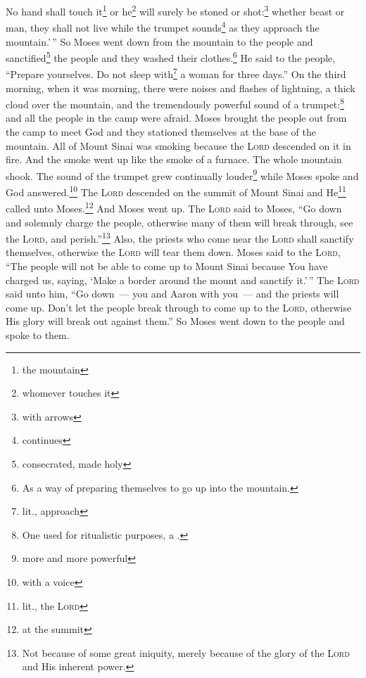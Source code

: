 \begin{enumerate}[align=center]
     No hand shall touch it\footnote{the mountain} or he\footnote{whomever touches it} will surely be stoned or shot:\footnote{with arrows} whether beast or man, they shall not live while the trumpet sounds\footnote{continues} as they approach the mountain.'\,''%
     So Moses went down from the mountain to the people and sanctified\footnote{consecrated, made holy} the people and they washed their clothes.\footnote{As a way of preparing themselves to go up into the mountain.}%
     He said to the people, ``Prepare yourselves. Do not sleep with\footnote{lit., approach} a woman for three days.''%
     On the third morning, when it was morning, there were noises and flashes of lightning, a thick cloud over the mountain, and the tremendously powerful sound of a trumpet:\footnote{One used for ritualistic purposes, a .} and all the people in the camp were afraid.%
     Moses brought the people out from the camp to meet God and they stationed themselves at the base of the mountain.%
     All of Mount Sinai was smoking because the \textsc{Lord} descended on it in fire. And the smoke went up like the smoke of a furnace. The whole mountain shook.%
     The sound of the trumpet grew continually louder\footnote{more and more powerful} while Moses spoke and God answered.\footnote{with a voice}%
     The \textsc{Lord} descended on the summit of Mount Sinai and He\footnote{lit., the \textsc{Lord}} called unto Moses.\footnote{at the summit} And Moses went up.%
     The \textsc{Lord} said to Moses, ``Go down and solemnly charge the people, otherwise many of them will break through, see the \textsc{Lord}, and perish.''\footnote{Not because of some great iniquity, merely because of the glory of the \textsc{Lord} and His inherent power.}%
     Also, the priests who come near the \textsc{Lord} shall sanctify themselves, otherwise the \textsc{Lord} will tear them down.%
     Moses said to the \textsc{Lord}, ``The people will not be able to come up to Mount Sinai because You have charged us, saying, `Make a border around the mount and sanctify it.'\,''%
     The \textsc{Lord} said unto him, ``Go down~--- you and Aaron with you~--- and the priests will come up. Don't let the people break through to come up to the \textsc{Lord}, otherwise His glory will break out against them.''%
     So Moses went down to the people and spoke to them.%
\end{enumerate}
